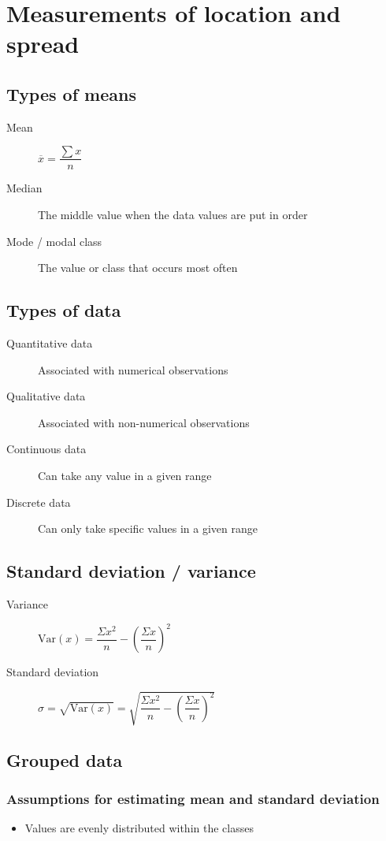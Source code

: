 \chapter{Measurements of location and spread}
\section{Types of means}
\begin{description}
	\item[Mean] $\overline{x}=\dfrac{\sum x}{n}$
	\item[Median] The middle value when the data values are put in order
	\item[Mode / modal class] The value or class that occurs most often
\end{description}

\section{Types of data}
\begin{description}
	\item[Quantitative data] Associated with numerical observations
	\item[Qualitative data] Associated with non-numerical observations
	\item[Continuous data] Can take any value in a given range
	\item[Discrete data] Can only take specific values in a given range
\end{description}

\section{Standard deviation / variance}
\begin{description}
	\item[Variance] $\mathrm{Var}(x)=\dfrac{\Sigma x^2}{n} - (\dfrac{\Sigma x}{n})^2$
	\item[Standard deviation] $\sigma=\sqrt{\mathrm{Var}(x)}=\sqrt{\dfrac{\Sigma x^2}{n} - (\dfrac{\Sigma x}{n})^2}$
\end{description}

\section{Grouped data}
\subsection{Assumptions for estimating mean and standard deviation}
\begin{itemize}
	\item Values are evenly distributed within the classes
\end{itemize}

